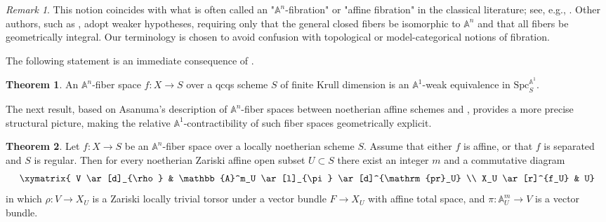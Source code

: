 \documentclass[10pt]{amsart}
\renewcommand{\AA}{\mathbb{A}}
\numberwithin{equation}{section} %
\theoremstyle{plain}
\theoremstyle{definition}
\newtheorem{theorem}[theorem]{Theorem}
\theoremstyle{remark}
\newtheorem{remark}[remark]{Remark}
\begin{document}
\begin{remark}
This notion coincides with what is often called an "$\AA^n$-fibration" or "affine fibration" in the classical literature; see, e.g., \cite{sathaye1983polynomial, asanuma1987polynomial, BhD92, DF10}. Other authors, such as \cite{KM78, KW85}, adopt weaker hypotheses, requiring only that the general closed fibers be isomorphic to $\AA^n$ and that all fibers be geometrically integral. Our terminology is chosen to avoid confusion with topological or model-categorical notions of fibration.
\end{remark}

The following statement is an immediate consequence of .

\begin{theorem} \label{thm:glue-A1-fiber}
An $\AA^n$-fiber space $f:X\to S$ over a qcqs scheme $S$ of finite Krull dimension is an $\AA^1$-weak equivalence in $\mathrm{Spc}_S^{\AA^1}$.
\end{theorem}

The next result, based on Asanuma’s description of $\AA^n$-fiber spaces between noetherian affine schemes \cite[Theorem 4.5]{asanuma82} and \cite[Theorem 3.4]{asanuma1987polynomial}, provides a more precise structural picture, making the relative $\AA^1$-contractibility of such fiber spaces geometrically explicit.

\begin{theorem}\label{thm:An-fiber-space-contractible}
Let $f:X\to S$ be an $\AA^n$-fiber space over a locally noetherian scheme $S$. Assume that either $f$ is affine, or that $f$ is separated and $S$ is regular. Then for every noetherian Zariski affine open subset $U\subset S$ there exist an integer $m$ and a commutative diagram
\[
\xymatrix{ V \ar[d]_{\rho} & \AA^m_U \ar[l]_{\pi} \ar[d]^{\mathrm{pr}_U} \\ X_U \ar[r]^{f_U}  & U}
\]
in which $\rho:V\to X_U$ is a Zariski locally trivial torsor under a vector bundle $F\to X_U$ with affine total space, and $\pi:\AA^m_U\to V$ is a vector bundle.
\end{theorem}
\end{document}
